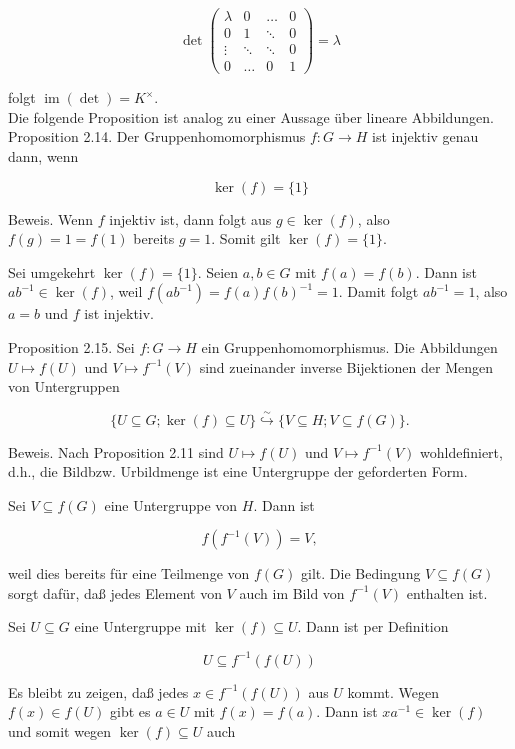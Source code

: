 \documentclass[10pt, letterpaper]{article}
\begin{document}
$$
\operatorname{det}\left(\begin{array}{cccc}
\lambda & 0 & \ldots & 0 \\
0 & 1 & \ddots & 0 \\
\vdots & \ddots & \ddots & 0 \\
0 & \ldots & 0 & 1
\end{array}\right)=\lambda
$$

folgt $\operatorname{im}(\operatorname{det})=K^{\times}$.\\
Die folgende Proposition ist analog zu einer Aussage über lineare Abbildungen.\\
Proposition 2.14. Der Gruppenhomomorphismus $f: G \rightarrow H$ ist injektiv genau dann, wenn

$$
\operatorname{ker}(f)=\{1\}
$$

Beweis. Wenn $f$ injektiv ist, dann folgt aus $g \in \operatorname{ker}(f)$, also $f(g)=1=f(1)$ bereits $g=1$. Somit gilt $\operatorname{ker}(f)=\{1\}$.

Sei umgekehrt $\operatorname{ker}(f)=\{1\}$. Seien $a, b \in G$ mit $f(a)=f(b)$. Dann ist $a b^{-1} \in \operatorname{ker}(f)$, weil $f\left(a b^{-1}\right)=f(a) f(b)^{-1}=1$. Damit folgt $a b^{-1}=1$, also $a=b$ und $f$ ist injektiv.

Proposition 2.15. Sei $f: G \rightarrow H$ ein Gruppenhomomorphismus. Die Abbildungen $U \mapsto f(U)$ und $V \mapsto f^{-1}(V)$ sind zueinander inverse Bijektionen der Mengen von Untergruppen

$$
\{U \subseteq G ; \operatorname{ker}(f) \subseteq U\} \stackrel{\sim}{\hookrightarrow}\{V \subseteq H ; V \subseteq f(G)\} .
$$

Beweis. Nach Proposition 2.11 sind $U \mapsto f(U)$ und $V \mapsto f^{-1}(V)$ wohldefiniert, d.h., die Bildbzw. Urbildmenge ist eine Untergruppe der geforderten Form.

Sei $V \subseteq f(G)$ eine Untergruppe von $H$. Dann ist

$$
f\left(f^{-1}(V)\right)=V,
$$

weil dies bereits für eine Teilmenge von $f(G)$ gilt. Die Bedingung $V \subseteq f(G)$ sorgt dafür, daß jedes Element von $V$ auch im Bild von $f^{-1}(V)$ enthalten ist.

Sei $U \subseteq G$ eine Untergruppe mit $\operatorname{ker}(f) \subseteq U$. Dann ist per Definition

$$
U \subseteq f^{-1}(f(U))
$$

Es bleibt zu zeigen, daß jedes $x \in f^{-1}(f(U))$ aus $U$ kommt. Wegen $f(x) \in f(U)$ gibt es $a \in U$ mit $f(x)=f(a)$. Dann ist $x a^{-1} \in \operatorname{ker}(f)$ und somit wegen $\operatorname{ker}(f) \subseteq U$ auch
\end{document}

